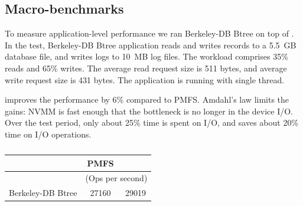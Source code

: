 \subsection{Macro-benchmarks}


To measure application-level performance we ran Berkeley-DB Btree on top of
\DAChell{}. In the test, Berkeley-DB Btree application reads and writes
records to a 5.5~GB database file, and writes logs to 10~MB log files.
The workload comprises 35\% reads and 65\% writes.
The average read request size is 511 bytes, 
and average write request size is 431 bytes. The application is running with 
single thread.

\DAChell{} improves the performance by 6\% compared to PMFS.
Amdahl's law limits the gains:  NVMM is fast enough that the bottleneck is no longer in
the device I/O.  Over the test period, only about 25\% time is spent on I/O, and
\DAChell{} saves about 20\% time on I/O operations.

\begin{table}
	\centering
	\begin{tabular}{|l|c|c|}
	\hline
	\multirow{2}{*}{}&PMFS &\DAChell{}\\\hline
	&\multicolumn{2}{c|}{(Ops per second)}\\\hline
	Berkeley-DB Btree & 27160 & 29019 \\\hline
	\end{tabular}
	\vspace*{3mm}
	\caption{}
	\label{table:bdb-quill}
\end{table}


